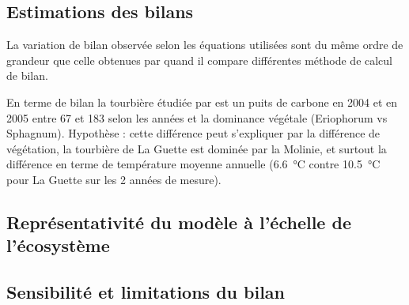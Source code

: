 \subsection{Estimations des bilans}


La variation de bilan observée selon les équations utilisées sont du même ordre de grandeur que celle obtenues par \cite{worrall2009} quand il compare différentes méthode de calcul de bilan.



En terme de bilan la tourbière étudiée par \cite{bortoluzzi2006} est un puits de carbone en 2004 et en 2005 entre 67 et \SI{183}{\gcma} selon les années et la dominance végétale (Eriophorum vs Sphagnum).
Hypothèse : cette différence peut s'expliquer par la différence de végétation, la tourbière de La Guette est dominée par la Molinie, et surtout la différence en terme de température moyenne annuelle (\SI{6.6}{\degreeCelsius} contre \SI{10.5}{\degreeCelsius} pour La Guette sur les 2 années de mesure).



\subsection{Représentativité du modèle à l'échelle de l'écosystème}

%
%
%
%
%





\subsection{Sensibilité et limitations du bilan}

